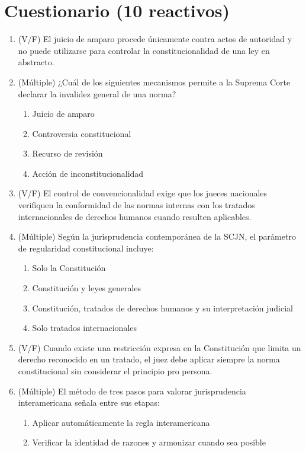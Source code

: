 \documentclass[12pt]{article}
\begin{document}
\section*{Cuestionario (10 reactivos)}
\begin{enumerate}
  \item (V/F) El juicio de amparo procede únicamente contra actos de autoridad y no puede utilizarse para controlar la constitucionalidad de una ley en abstracto.
  \item (Múltiple) ¿Cuál de los siguientes mecanismos permite a la Suprema Corte declarar la invalidez general de una norma?
    \begin{enumerate}[label=\Alph*.]
      \item Juicio de amparo
      \item Controversia constitucional
      \item Recurso de revisión
      \item Acción de inconstitucionalidad
    \end{enumerate}
  \item (V/F) El control de convencionalidad exige que los jueces nacionales verifiquen la conformidad de las normas internas con los tratados internacionales de derechos humanos cuando resulten aplicables.
  \item (Múltiple) Según la jurisprudencia contemporánea de la SCJN, el parámetro de regularidad constitucional incluye:
    \begin{enumerate}[label=\Alph*.]
      \item Solo la Constitución
      \item Constitución y leyes generales
      \item Constitución, tratados de derechos humanos y su interpretación judicial
      \item Solo tratados internacionales
    \end{enumerate}
  \item (V/F) Cuando existe una restricción expresa en la Constitución que limita un derecho reconocido en un tratado, el juez debe aplicar siempre la norma constitucional sin considerar el principio pro persona.
  \item (Múltiple) El método de tres pasos para valorar jurisprudencia interamericana señala entre sus etapas:
    \begin{enumerate}[label=\Alph*.]
      \item Aplicar automáticamente la regla interamericana
      \item Verificar la identidad de razones y armonizar cuando sea posible

\end{enumerate}
\end{enumerate}
\end{document}
